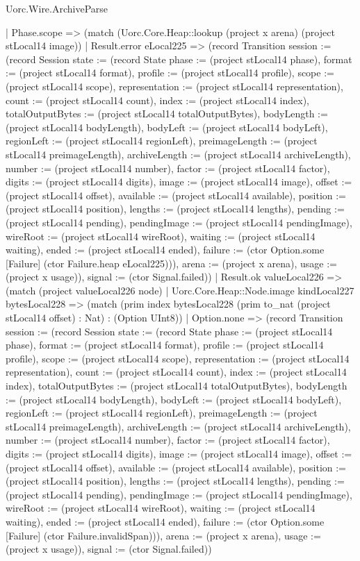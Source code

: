 \begin{lexlean}{Uorc.Wire.ArchiveParse}
\begin{semanticmodule}
{        | Phase.scope => (match (Uorc.Core.Heap::lookup (project x arena) (project stLocal14 image))
          | Result.error eLocal225 => (record Transition {session := (record Session {state := (record State {phase := (project stLocal14 phase), format := (project stLocal14 format), profile := (project stLocal14 profile), scope := (project stLocal14 scope), representation := (project stLocal14 representation), count := (project stLocal14 count), index := (project stLocal14 index), totalOutputBytes := (project stLocal14 totalOutputBytes), bodyLength := (project stLocal14 bodyLength), bodyLeft := (project stLocal14 bodyLeft), regionLeft := (project stLocal14 regionLeft), preimageLength := (project stLocal14 preimageLength), archiveLength := (project stLocal14 archiveLength), number := (project stLocal14 number), factor := (project stLocal14 factor), digits := (project stLocal14 digits), image := (project stLocal14 image), offset := (project stLocal14 offset), available := (project stLocal14 available), position := (project stLocal14 position), lengths := (project stLocal14 lengths), pending := (project stLocal14 pending), pendingImage := (project stLocal14 pendingImage), wireRoot := (project stLocal14 wireRoot), waiting := (project stLocal14 waiting), ended := (project stLocal14 ended), failure := (ctor Option.some [Failure] (ctor Failure.heap eLocal225))}), arena := (project x arena), usage := (project x usage)}), signal := (ctor Signal.failed)})
          | Result.ok valueLocal226 => (match (project valueLocal226 node)
            | Uorc.Core.Heap::Node.image kindLocal227 bytesLocal228 => (match (prim index bytesLocal228 (prim to_nat (project stLocal14 offset) : Nat) : (Option UInt8))
              | Option.none => (record Transition {session := (record Session {state := (record State {phase := (project stLocal14 phase), format := (project stLocal14 format), profile := (project stLocal14 profile), scope := (project stLocal14 scope), representation := (project stLocal14 representation), count := (project stLocal14 count), index := (project stLocal14 index), totalOutputBytes := (project stLocal14 totalOutputBytes), bodyLength := (project stLocal14 bodyLength), bodyLeft := (project stLocal14 bodyLeft), regionLeft := (project stLocal14 regionLeft), preimageLength := (project stLocal14 preimageLength), archiveLength := (project stLocal14 archiveLength), number := (project stLocal14 number), factor := (project stLocal14 factor), digits := (project stLocal14 digits), image := (project stLocal14 image), offset := (project stLocal14 offset), available := (project stLocal14 available), position := (project stLocal14 position), lengths := (project stLocal14 lengths), pending := (project stLocal14 pending), pendingImage := (project stLocal14 pendingImage), wireRoot := (project stLocal14 wireRoot), waiting := (project stLocal14 waiting), ended := (project stLocal14 ended), failure := (ctor Option.some [Failure] (ctor Failure.invalidSpan))}), arena := (project x arena), usage := (project x usage)}), signal := (ctor Signal.failed)})
}
\end{semanticmodule}
\end{lexlean}
